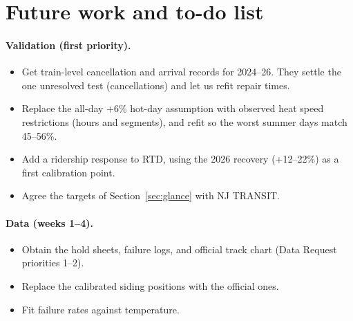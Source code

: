 \documentclass[11pt]{article}
\begin{document}
\section{Future work and to-do list}
\paragraph{Validation (first priority).}
\begin{itemize}
\item Get train-level cancellation and arrival records for 2024--26. They settle the one unresolved test (cancellations) and let us refit repair times.
\item Replace the all-day +6\% hot-day assumption with observed heat speed restrictions (hours and segments), and refit so the worst summer days match 45--56\%.
\item Add a ridership response to RTD, using the 2026 recovery (+12--22\%) as a first calibration point.
\item Agree the targets of Section~\ref{sec:glance} with NJ TRANSIT.
\end{itemize}
\paragraph{Data (weeks 1--4).}
\begin{itemize}
\item Obtain the hold sheets, failure logs, and official track chart (Data Request priorities 1--2).
\item Replace the calibrated siding positions with the official ones.
\item Fit failure rates against temperature.
\end{itemize}
\end{document}
